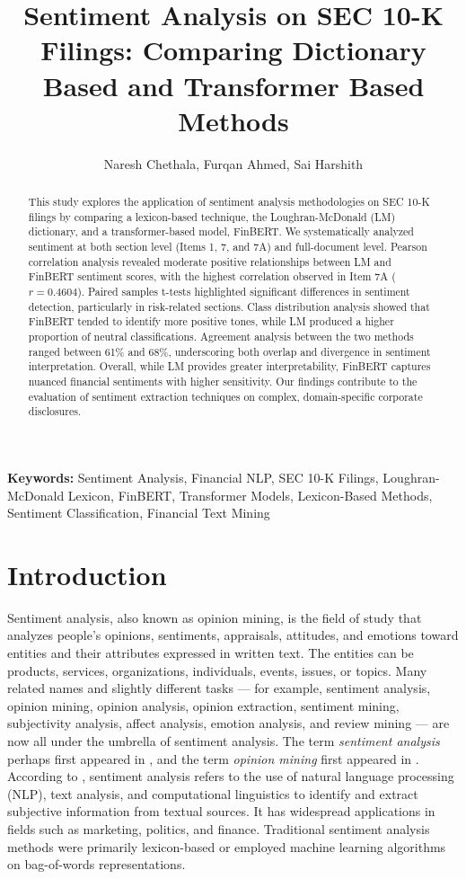 \documentclass[12pt]{article}
\title{Sentiment Analysis on SEC 10-K Filings: \newline Comparing Dictionary Based and Transformer Based Methods}
\author{Naresh Chethala, Furqan Ahmed, Sai Harshith}
\date{}
\begin{document}
\maketitle

\begin{abstract}
This study explores the application of sentiment analysis methodologies on SEC 10-K filings by comparing a lexicon-based technique, the Loughran-McDonald (LM) dictionary, and a transformer-based model, FinBERT. We systematically analyzed sentiment at both section level (Items 1, 7, and 7A) and full-document level. Pearson correlation analysis revealed moderate positive relationships between LM and FinBERT sentiment scores, with the highest correlation observed in Item 7A ($r=0.4604$). Paired samples t-tests highlighted significant differences in sentiment detection, particularly in risk-related sections. Class distribution analysis showed that FinBERT tended to identify more positive tones, while LM produced a higher proportion of neutral classifications. Agreement analysis between the two methods ranged between 61\% and 68\%, underscoring both overlap and divergence in sentiment interpretation. Overall, while LM provides greater interpretability, FinBERT captures nuanced financial sentiments with higher sensitivity. Our findings contribute to the evaluation of sentiment extraction techniques on complex, domain-specific corporate disclosures.
\end{abstract}

\textbf{Keywords:} Sentiment Analysis, Financial NLP, SEC 10-K Filings, Loughran-McDonald Lexicon, FinBERT, Transformer Models, Lexicon-Based Methods, Sentiment Classification, Financial Text Mining
\section{Introduction}
Sentiment analysis, also known as opinion mining, is the field of study that analyzes people's opinions, sentiments, appraisals, attitudes, and emotions toward entities and their attributes expressed in written text. The entities can be products, services, organizations, individuals, events, issues, or topics. Many related names and slightly different tasks — for example, sentiment analysis, opinion mining, opinion analysis, opinion extraction, sentiment mining, subjectivity analysis, affect analysis, emotion analysis, and review mining — are now all under the umbrella of sentiment analysis. The term \textit{sentiment analysis} perhaps first appeared in \citep{Nasukawa2003}, and the term \textit{opinion mining} first appeared in \citep{Dave2003}. According to \citet{Pang2008}, sentiment analysis refers to the use of natural language processing (NLP), text analysis, and computational linguistics to identify and extract subjective information from textual sources. It has widespread applications in fields such as marketing, politics, and finance. Traditional sentiment analysis methods were primarily lexicon-based or employed machine learning algorithms on bag-of-words representations.
\end{document}
